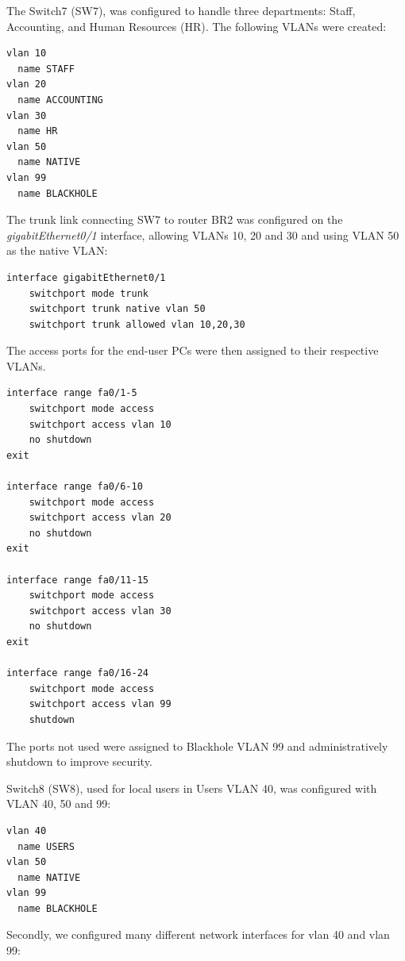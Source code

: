The Switch7 (SW7), was configured to handle three departments: Staff, Accounting, and Human Resources (HR).
The following VLANs were created:

\begin{lstlisting}[caption={VLAN creation on SW7}, label={lst:sw7-vlan-creation}]
vlan 10
  name STAFF
vlan 20
  name ACCOUNTING
vlan 30
  name HR
vlan 50
  name NATIVE
vlan 99
  name BLACKHOLE
\end{lstlisting}

The trunk link connecting SW7 to router BR2 was configured on the \textit{gigabitEthernet0/1} interface, allowing VLANs 10, 20 and 30 and using VLAN 50 as the native VLAN:

\begin{lstlisting}[caption={Trunk configuration on SW7}, label={lst:sw7-trunk}]
interface gigabitEthernet0/1
    switchport mode trunk
    switchport trunk native vlan 50
    switchport trunk allowed vlan 10,20,30
\end{lstlisting}

The access ports for the end-user PCs were then assigned to their respective VLANs.

\begin{lstlisting}[caption={Access port configuration on SW7}, label={lst:sw7-access}]
interface range fa0/1-5
    switchport mode access
    switchport access vlan 10
    no shutdown
exit

interface range fa0/6-10
    switchport mode access
    switchport access vlan 20
    no shutdown
exit

interface range fa0/11-15
    switchport mode access
    switchport access vlan 30
    no shutdown
exit

interface range fa0/16-24
    switchport mode access
    switchport access vlan 99
    shutdown
\end{lstlisting}

The ports not used were assigned to Blackhole VLAN 99 and administratively shutdown to improve security.

Switch8 (SW8), used for local users in Users VLAN 40, was configured with VLAN 40, 50 and 99:

\begin{lstlisting}[caption={VLAN creation on SW8}, label={lst:sw8-vlan-creation}]
vlan 40
  name USERS
vlan 50
  name NATIVE
vlan 99
  name BLACKHOLE
\end{lstlisting}


Secondly, we configured many different network interfaces for vlan 40 and vlan 99:

